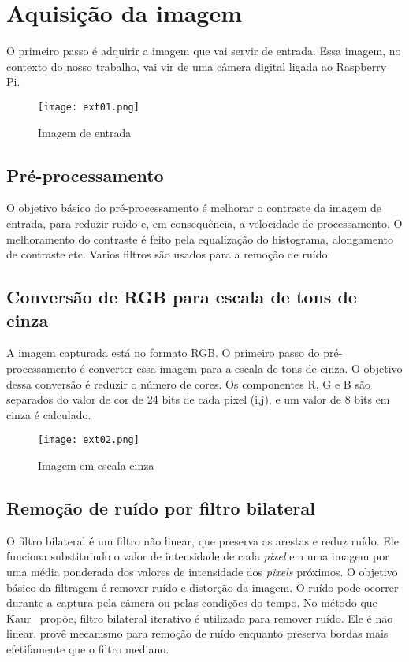 \section{Aquisição da imagem}

O primeiro passo é adquirir a imagem que vai servir de entrada. Essa imagem, no
contexto do nosso trabalho, vai vir de uma câmera digital ligada ao Raspberry
Pi.

\begin{figure}[H]
	\centering
	\texttt{[image: ext01.png]}
	\caption{Imagem de entrada}
	\label{fig:ext_input_image}
\end{figure}

\subsection{Pré-processamento}

O objetivo básico do pré-processamento é melhorar o contraste da imagem de
entrada, para reduzir ruído e, em consequência, a velocidade de
processamento. O melhoramento do contraste é feito pela equalização do
histograma, alongamento de contraste etc. Varios filtros são usados para a
remoção de ruído.

\subsection{Conversão de RGB para escala de tons de cinza}

A imagem capturada está no formato RGB\@. O primeiro passo do pré-processamento é
converter essa imagem para a escala de tons de cinza. O objetivo dessa conversão é reduzir
o número de cores. Os componentes R, G e B são separados do valor de cor de 24
bits de cada pixel (i,j), e um valor de 8 bits em cinza é calculado.

\begin{figure}[H]
	\centering
	\texttt{[image: ext02.png]}
	\caption{Imagem em escala cinza}
	\label{fig:ext_gray_scale}
\end{figure}

\subsection{Remoção de ruído por filtro bilateral}

O filtro bilateral é um filtro não linear, que preserva as arestas e reduz ruído.
Ele funciona substituindo o valor de intensidade de cada \emph{pixel} em uma imagem
por uma média ponderada dos valores de intensidade dos \emph{pixels} próximos.
O objetivo básico da filtragem é remover ruído e distorção da imagem. O ruído
pode ocorrer durante a captura pela câmera ou pelas condições do tempo. No
método que Kaur~\cite{kaur2014efficient} propõe, filtro bilateral iterativo é
utilizado para remover ruído. Ele é não linear, provê mecanismo para remoção de
ruído enquanto preserva bordas mais efetifamente que o filtro mediano.

